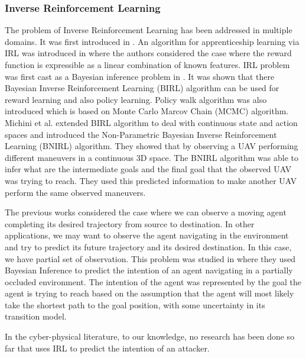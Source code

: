 \documentclass[conference]{IEEEtran}
\begin{document}
\subsubsection{Inverse Reinforcement Learning}
The problem of Inverse Reinforcement Learning has been addressed in multiple domains. It was first introduced in \cite{Ng2000}. An algorithm for apprenticeship learning via IRL was introduced in \cite{Abbeel2004a} where the authors considered the case where the reward function is expressible as a linear combination of known features. IRL problem was first cast as a Bayesian inference problem in  \cite{Ramachandran2007}. It was shown that there Bayesian Inverse Reinforcement Learning (BIRL) algorithm can be used for reward learning and also policy learning. Policy walk algorithm was also introduced which is based on Monte Carlo Marcov Chain (MCMC) algorithm. Michini et al. \cite{Michini2015,Michini2013,Michini2012} extended BIRL algorithm to deal with continuous state and action spaces and introduced the Non-Parametric Bayesian Inverse Reinforcement Learning (BNIRL) algorithm. They  showed that by observing a UAV performing different maneuvers in a continuous 3D space. The BNIRL algorithm was able to infer what are the intermediate goals and the final goal that the observed UAV was trying to reach. They used this predicted information to make another UAV perform the same observed maneuvers.

The previous works considered the case where we can observe a moving agent completing its desired trajectory from source to destination. In other applications, we may want to observe the agent navigating in the environment and try to predict its future trajectory and its desired destination. In this case, we have partial set of observation. This problem was studied in \cite{Best2015} where they used Bayesian Inference to predict the intention of an agent navigating in a partially occluded environment. The intention of the agent was represented by the goal the agent is trying to reach based on the assumption that the agent will most likely take the shortest path to the goal position, with some uncertainty in its transition model.

In the cyber-physical literature, to our knowledge, no research has been done so far that uses IRL to predict the intention of an attacker.
\end{document}
